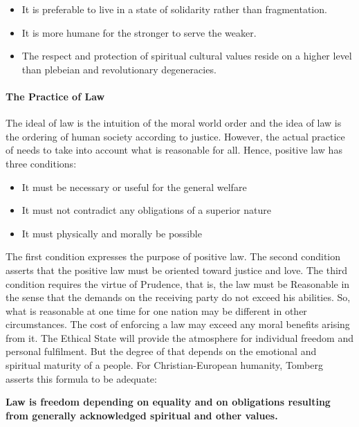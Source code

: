 \begin{itemize}


\item It is preferable to live in a state of solidarity rather than fragmentation.

\item It is more humane for the stronger to serve the weaker.

\item The respect and protection of spiritual cultural values reside on a higher level than plebeian and revolutionary degeneracies.
\end{itemize}


\paragraph{The Practice of Law}


The ideal of law is the intuition of the moral world order and the idea of law is the ordering of human society according to justice. However, the actual practice of needs to take into account what is reasonable for all. Hence, positive law has three conditions:

\begin{itemize}


\item It must be necessary or useful for the general welfare

\item It must not contradict any obligations of a superior nature

\item It must physically and morally be possible
\end{itemize}


The first condition expresses the purpose of positive law. The second condition asserts that the positive law must be oriented toward justice and love. The third condition requires the virtue of Prudence, that is, the law must be Reasonable in the sense that the demands on the receiving party do not exceed his abilities. So, what is reasonable at one time for one nation may be different in other circumstances. The cost of enforcing a law may exceed any moral benefits arising from it. The Ethical State will provide the atmosphere for individual freedom and personal fulfilment. But the degree of that depends on the emotional and spiritual maturity of a people. For Christian-European humanity, Tomberg asserts this formula to be adequate:

\textbf{Law is freedom depending on equality and on obligations resulting from generally acknowledged spiritual and other values.}

